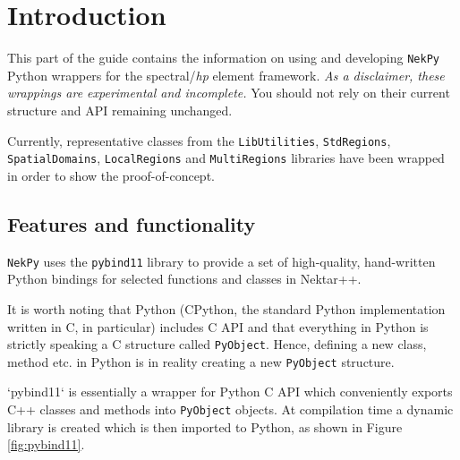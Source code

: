 \chapter{Introduction}

This part of the guide contains the information on using and developing
\texttt{NekPy} Python wrappers for the \nek{} spectral/\textit{hp} element
framework.  \emph{As a disclaimer, these wrappings are experimental and
  incomplete.}  You should not rely on their current structure and API remaining
unchanged.

Currently, representative classes from the \texttt{LibUtilities},
\texttt{StdRegions}, \texttt{SpatialDomains}, \texttt{LocalRegions} and
\texttt{MultiRegions} libraries have been wrapped in order to show the
proof-of-concept.

\section{Features and functionality}

\texttt{NekPy} uses the \texttt{pybind11} library to provide a set of
high-quality, hand-written Python bindings for selected functions and classes in
Nektar++.

It is worth noting that Python (CPython, the standard Python implementation
written in C, in particular) includes C API and that everything in Python is
strictly speaking a C structure called \texttt{PyObject}. Hence, defining a new
class, method etc. in Python is in reality creating a new \texttt{PyObject}
structure.

`pybind11` is essentially a wrapper for Python C API which conveniently exports
C++ classes and methods into \texttt{PyObject} objects. At compilation time a
dynamic library is created which is then imported to Python, as shown in Figure
\ref{fig:pybind11}.

